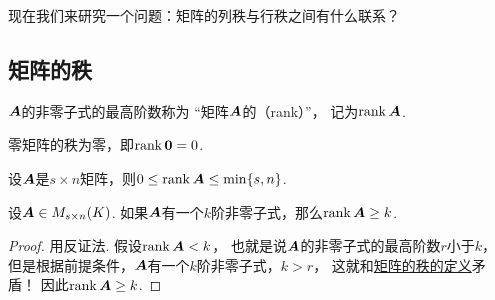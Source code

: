 现在我们来研究一个问题：矩阵的列秩与行秩之间有什么联系？

\subsection{矩阵的秩}
\begin{definition}\label{definition:线性方程组.矩阵的秩的定义}
\(\boldsymbol{A}\)的非零子式的最高阶数称为
“矩阵\(\boldsymbol{A}\)的（rank）”，
记为\(\rank\boldsymbol{A}\).
\end{definition}

\begin{property}\label{theorem:线性方程组.矩阵的秩的性质1}
零矩阵的秩为零，即\(\rank\boldsymbol{0} = 0\).
\end{property}

\begin{property}\label{theorem:线性方程组.矩阵的秩的性质2}
设\(\boldsymbol{A}\)是\(s \times n\)矩阵，则\(0 \leq \rank\boldsymbol{A} \leq \min\{s,n\}\).
\end{property}

\begin{theorem}
设\(\boldsymbol{A}\in M_{s \times n}(K)\).
如果\(\boldsymbol{A}\)有一个\(k\)阶非零子式，那么\(\rank\boldsymbol{A}\geq k\).
\begin{proof}
用反证法.
假设\(\rank\boldsymbol{A}<k\)，
也就是说\(\boldsymbol{A}\)的非零子式的最高阶数\(r\)小于\(k\)，
但是根据前提条件，\(\boldsymbol{A}\)有一个\(k\)阶非零子式，\(k>r\)，
这就和\hyperref[definition:线性方程组.矩阵的秩的定义]{矩阵的秩的定义}矛盾！
因此\(\rank\boldsymbol{A}\geq k\).
\end{proof}
\end{theorem}

